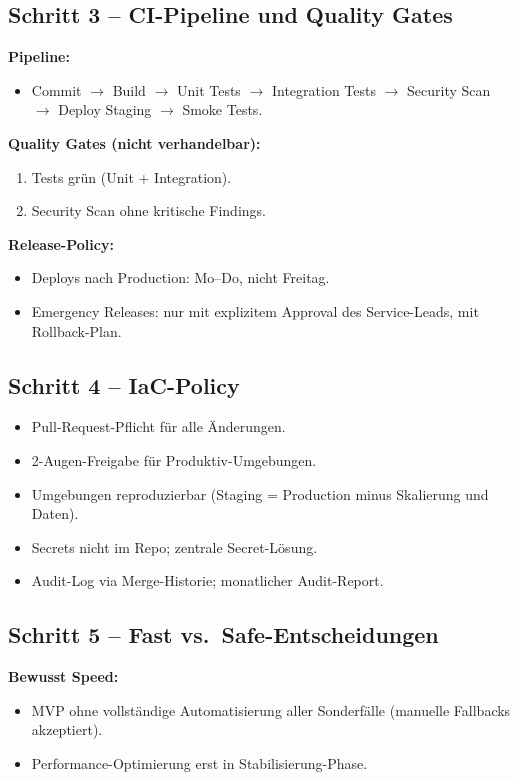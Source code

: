 \documentclass[11pt,a4paper,oneside]{article}
\begin{document}
\subsection{Schritt 3 -- CI-Pipeline und Quality Gates}

\textbf{Pipeline:}
\begin{itemize}
  \item Commit $\rightarrow$ Build $\rightarrow$ Unit Tests $\rightarrow$ Integration Tests $\rightarrow$ Security Scan $\rightarrow$ Deploy Staging $\rightarrow$ Smoke Tests.
\end{itemize}

\textbf{Quality Gates (nicht verhandelbar):}
\begin{enumerate}
  \item Tests grün (Unit + Integration).
  \item Security Scan ohne kritische Findings.
\end{enumerate}

\textbf{Release-Policy:}
\begin{itemize}
  \item Deploys nach Production: Mo--Do, nicht Freitag.
  \item Emergency Releases: nur mit explizitem Approval des Service-Leads, mit Rollback-Plan.
\end{itemize}

\subsection{Schritt 4 -- IaC-Policy}

\begin{itemize}
  \item Pull-Request-Pflicht für alle Änderungen.
  \item 2-Augen-Freigabe für Produktiv-Umgebungen.
  \item Umgebungen reproduzierbar (Staging = Production minus Skalierung und Daten).
  \item Secrets nicht im Repo; zentrale Secret-Lösung.
  \item Audit-Log via Merge-Historie; monatlicher Audit-Report.
\end{itemize}

\subsection{Schritt 5 -- Fast vs.\ Safe-Entscheidungen}

\textbf{Bewusst Speed:}
\begin{itemize}
  \item MVP ohne vollständige Automatisierung aller Sonderfälle (manuelle Fallbacks akzeptiert).
  \item Performance-Optimierung erst in Stabilisierung-Phase.
\end{itemize}
\end{document}
